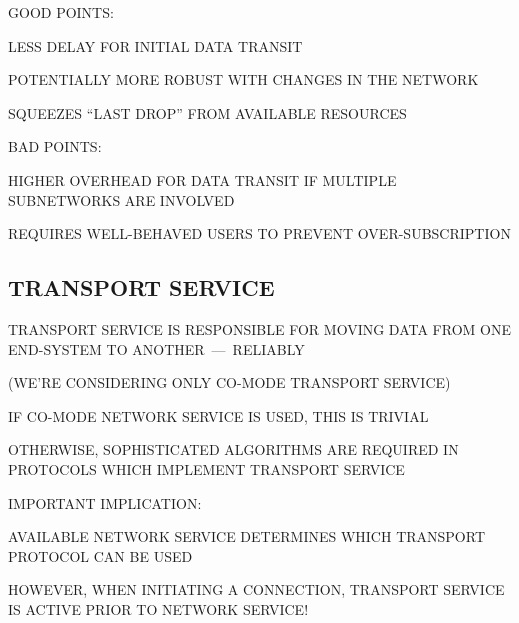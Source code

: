 \begin{bwslide}

\begin{nrtc}
\item	GOOD POINTS:
    \begin{nrtc}
    \item	LESS DELAY FOR INITIAL DATA TRANSIT

    \item	POTENTIALLY MORE ROBUST WITH CHANGES IN THE NETWORK

    \item	SQUEEZES ``LAST DROP'' FROM AVAILABLE RESOURCES
    \end{nrtc}

\item	BAD POINTS:
    \begin{nrtc}
    \item	HIGHER OVERHEAD FOR DATA TRANSIT IF MULTIPLE SUBNETWORKS
		ARE INVOLVED

    \item	REQUIRES WELL-BEHAVED USERS TO PREVENT OVER-SUBSCRIPTION
    \end{nrtc}
\end{nrtc}
\end{bwslide}


\begin{bwslide}
\part*	{TRANSPORT SERVICE}

\begin{nrtc}
\item	TRANSPORT SERVICE IS RESPONSIBLE FOR MOVING DATA FROM ONE END-SYSTEM
	TO ANOTHER~---~RELIABLY
    \begin{nrtc}
    \item	(WE'RE CONSIDERING ONLY CO-MODE TRANSPORT SERVICE)
    \end{nrtc}

\item	IF CO-MODE NETWORK SERVICE IS USED, THIS IS TRIVIAL

\item	OTHERWISE, SOPHISTICATED ALGORITHMS ARE REQUIRED IN PROTOCOLS
	WHICH IMPLEMENT TRANSPORT SERVICE
\end{nrtc}
\end{bwslide}


\begin{bwslide}

\begin{nrtc}
\item	IMPORTANT IMPLICATION:\\
    \begin{nrtc}
    \item	AVAILABLE NETWORK SERVICE DETERMINES WHICH
		TRANSPORT PROTOCOL CAN BE USED

    \item	HOWEVER, WHEN INITIATING A CONNECTION,
		TRANSPORT SERVICE IS ACTIVE PRIOR TO NETWORK SERVICE!
    \end{nrtc}
\end{nrtc}
\end{bwslide}


